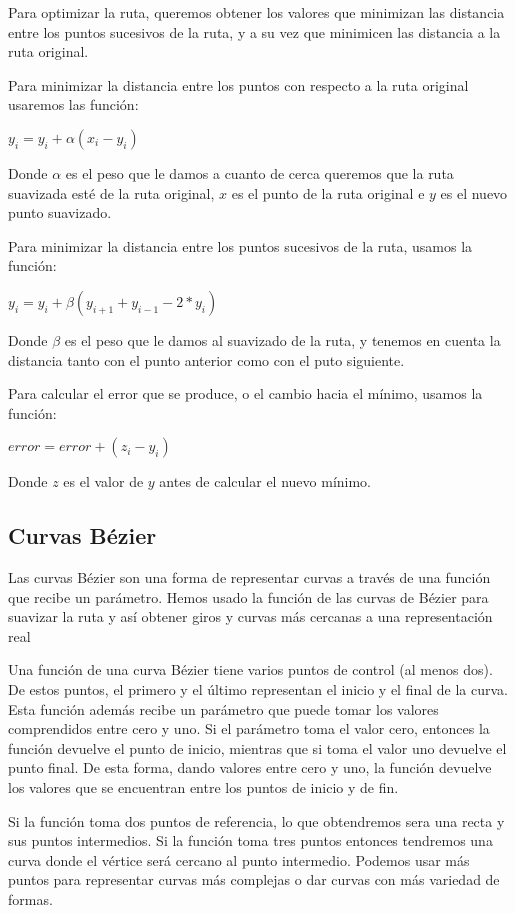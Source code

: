 Para optimizar la ruta, queremos obtener los valores que minimizan las distancia entre los puntos sucesivos de la ruta, y a su vez que minimicen las distancia a la ruta original.

Para minimizar la distancia entre los puntos con respecto a la ruta original usaremos las función:
\begin{center}
$y_i = y_i + \alpha (x_i - y_i)$
\end{center}
Donde $\alpha$ es el peso que le damos a cuanto de cerca queremos que la ruta suavizada esté de la ruta original, $x$ es el punto de la ruta original e $y$ es el nuevo punto suavizado.

Para minimizar la distancia entre los puntos sucesivos de la ruta, usamos la función:
\begin{center}
$y_i = y_i + \beta (y_{i+1} + y_{i-1} - 2 * y_i)$
\end{center}
Donde $\beta$ es el peso que le damos al suavizado de la ruta, y tenemos en cuenta la distancia tanto con el punto anterior como con el puto siguiente.

Para calcular el error que se produce, o el cambio hacia el mínimo, usamos la función:
\begin{center}
$error = error + (z_i - y_i)$
\end{center}
Donde $z$ es el valor de $y$ antes de calcular el nuevo mínimo.

\subsection{Curvas Bézier}
Las curvas Bézier \cite{bezierdevmag, wiki:bezier} son una forma de representar curvas a través de una función que recibe un parámetro. Hemos usado la función de las curvas de Bézier para suavizar la ruta y así obtener giros y curvas más cercanas a una representación real

Una función de una curva Bézier tiene varios puntos de control (al menos dos). De estos puntos, el primero y el último representan el inicio y el final de la curva. Esta función además recibe un parámetro que puede tomar los valores comprendidos entre cero y uno. Si el parámetro toma el valor cero, entonces la función devuelve el punto de inicio, mientras que si toma el valor uno devuelve el punto final. De esta forma, dando valores entre cero y uno, la función devuelve los valores que se encuentran entre los puntos de inicio y de fin.

Si la función toma dos puntos de referencia, lo que obtendremos sera una recta y sus puntos intermedios. Si la función toma tres puntos entonces tendremos una curva donde el vértice será cercano al punto intermedio. Podemos usar más puntos para representar curvas más complejas o dar curvas con más variedad de formas.

